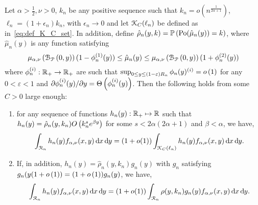 \begin{lemma}\label{lem:concentration_argument_rho_approximation}
Let $\alpha > \frac{1}{2}, \nu > 0$, $k_n$ be any positive sequence such that $k_n = o(n^{\frac{1}{2\alpha + 1}})$, $\ell_n = (1 + \epsilon_n)k_n$, with $\epsilon_n \to 0$ and let ${\mathcal K}_{C}(\ell_n)$ be defined as in~\eqref{eq:def_K_C_set}. In addition, define $\hat{\rho}_n(y,k) = \mathbb{P}\left({\mathrm{Po}}(\hat{\mu}_n(y)) = k\right)$, where $\hat{\mu}_n(y)$ is any function satisfying 
\[
	\mu_{\alpha,\nu}\left({\mathcal B}_{{\mathcal P}}\left(0,y\right)\right)(1 - \phi_n^{(1)}(y)) \le \hat{\mu}_n(y) \le \mu_{\alpha,\nu}\left({\mathcal B}_{{\mathcal P}}\left(0,y\right)\right)(1 + \phi_n^{(2)}(y))
\]
where $\phi_n^{(i)} : {\mathbb R}_+ \to {\ensuremath{\mathbb R}}_+$ are such that $\sup_{0 \le y \le (1-\varepsilon)R_n} \phi_n(y)^{(i)} = o\left(1\right)$ for any $0 < \varepsilon < 1$ and $\partial \phi_n^{(i)}(y)/\partial y = \Theta\left(\phi_n^{(i)}(y)\right)$. Then the following holds from some $C > 0$ large enough:
\begin{enumerate}
\item for any sequence of functions $h_n(y) : {\mathbb R}_+ \mapsto {\ensuremath{\mathbb R}}$ such that $h_n(y) = \hat{\rho}_n(y,k_n) O\left(k_n^s e^{\beta y}\right)$ for some $s < 2\alpha(2\alpha + 1)$ and $\beta < \alpha$, we have,
\[
	\int_{{\mathcal R}_n} h_n(y) f_{\alpha,\nu}(x,y) \operatorname{\mathrm{d}\hspace{-2pt}} x \operatorname{\mathrm{d}\hspace{-2pt}} y 
	= (1 + o(1)) \int_{{\mathcal K}_{C}(\ell_n)} h_n(y) f_{\alpha,\nu}(x,y) \operatorname{\mathrm{d}\hspace{-2pt}} x \operatorname{\mathrm{d}\hspace{-2pt}} y.
\]
\item If, in addition, $h_n(y) = \hat{\rho}_n(y,k_n) g_n(y)$ with $g_n$ satisfying $g_n(y(1+o\left(1\right)) = (1+o\left(1\right))g_n(y)$, we have,
\[
	\int_{{\mathcal R}_n} h_n(y) f_{\alpha,\nu}(x,y) \operatorname{\mathrm{d}\hspace{-2pt}} x \operatorname{\mathrm{d}\hspace{-2pt}} y 
	= (1 + o(1)) \int_{{\mathcal R}_n} \rho(y,k_n) g_n(y) f_{\alpha,\nu}(x,y) \operatorname{\mathrm{d}\hspace{-2pt}} x \operatorname{\mathrm{d}\hspace{-2pt}} y.
\]
\end{enumerate}
\end{lemma}

